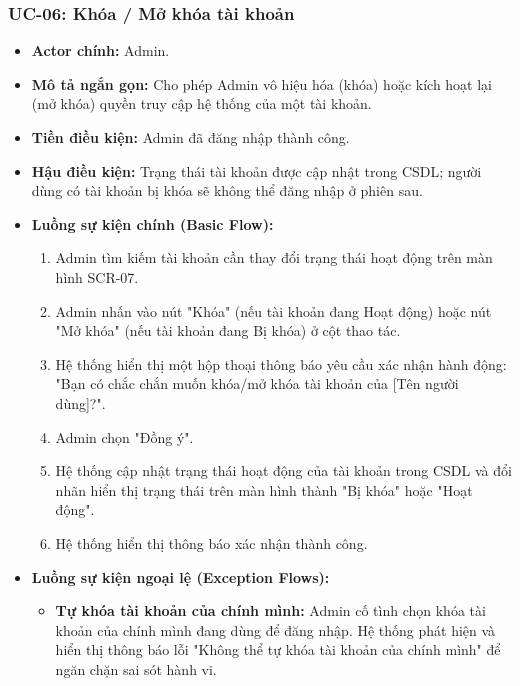 \subsubsection{UC-06: Khóa / Mở khóa tài khoản}
\label{subsubsec:uc06_toggle_user}
\begin{itemize}
    \item \textbf{Actor chính:} Admin.
    \item \textbf{Mô tả ngắn gọn:} Cho phép Admin vô hiệu hóa (khóa) hoặc kích hoạt lại (mở khóa) quyền truy cập hệ thống của một tài khoản.
    \item \textbf{Tiền điều kiện:} Admin đã đăng nhập thành công.
    \item \textbf{Hậu điều kiện:} Trạng thái tài khoản được cập nhật trong CSDL; người dùng có tài khoản bị khóa sẽ không thể đăng nhập ở phiên sau.
    \item \textbf{Luồng sự kiện chính (Basic Flow):}
        \begin{enumerate}
            \item Admin tìm kiếm tài khoản cần thay đổi trạng thái hoạt động trên màn hình SCR-07.
            \item Admin nhấn vào nút "Khóa" (nếu tài khoản đang Hoạt động) hoặc nút "Mở khóa" (nếu tài khoản đang Bị khóa) ở cột thao tác.
            \item Hệ thống hiển thị một hộp thoại thông báo yêu cầu xác nhận hành động: "Bạn có chắc chắn muốn khóa/mở khóa tài khoản của [Tên người dùng]?".
            \item Admin chọn "Đồng ý".
            \item Hệ thống cập nhật trạng thái hoạt động của tài khoản trong CSDL và đổi nhãn hiển thị trạng thái trên màn hình thành "Bị khóa" hoặc "Hoạt động".
            \item Hệ thống hiển thị thông báo xác nhận thành công.
        \end{enumerate}
    \item \textbf{Luồng sự kiện ngoại lệ (Exception Flows):}
        \begin{itemize}
            \item \textbf{Tự khóa tài khoản của chính mình:} Admin cố tình chọn khóa tài khoản của chính mình đang dùng để đăng nhập. Hệ thống phát hiện và hiển thị thông báo lỗi "Không thể tự khóa tài khoản của chính mình" để ngăn chặn sai sót hành vi.
        \end{itemize}
\end{itemize}

\enlargethispage{1.5cm}

